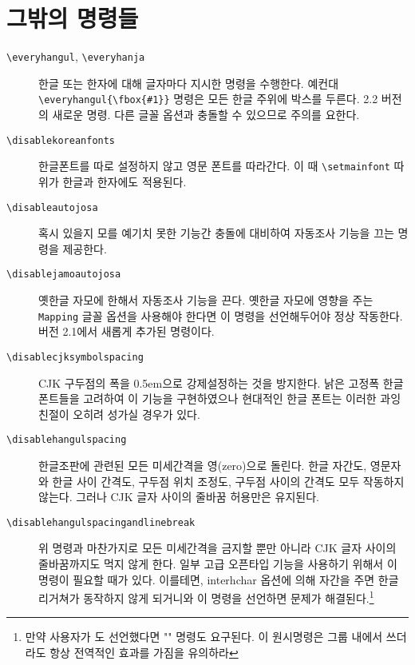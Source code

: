 \documentclass[a4paper]{article}
\def\logoko{\textsf{k}\kern-.2ex\textit{o}}
\def\XeTeX{\hologo{XeTeX}}
\def\xetexko{\XeTeX\kern-.1ex -\logoko}
\def\cs#1{\texttt{\textbackslash #1}}
\begin{document}
\section{그밖의 명령들}
\begin{description}
  \item[\cs{everyhangul}, \cs{everyhanja}]
    한글 또는 한자에 대해 글자마다 지시한 명령을 수행한다. 예컨대
    \verb|\everyhangul{\fbox{#1}}| 명령은 모든
    {\fboxsep=1pt 한글 주위에 박스}를
    두른다.  2.2 버전의 새로운 명령. 다른 글꼴 옵션과 충돌할 수 있으므로
    주의를 요한다.

  \item[\cs{disablekoreanfonts}]
한글폰트를 따로 설정하지 않고 영문 폰트를 따라간다.
이 때  \verb|\setmainfont| 따위가 한글과 한자에도 적용된다.

  \item[\cs{disableautojosa}]
혹시 있을지 모를 예기치 못한 기능간 충돌에 대비하여 자동조사 기능을
끄는 명령을 제공한다.

  \item[\cs{disablejamoautojosa}]
옛한글 자모에 한해서 자동조사 기능을 끈다.
옛한글 자모에 영향을 주는 \verb+Mapping+ 글꼴 옵션을 사용해야 한다면
이 명령을 선언해두어야 정상 작동한다.
버전 2.1에서 새롭게 추가된 명령이다.

  \item[\cs{disablecjksymbolspacing}]
CJK 구두점의 폭을 0.5em으로 강제설정하는 것을 방지한다.
 낡은 고정폭 한글 폰트들을 고려하여 이 기능을 구현하였으나
현대적인 한글 폰트는 이러한 과잉친절이 오히려 성가실 경우가 있다.

  \item[\cs{disablehangulspacing}]
한글조판에 관련된 모든 미세간격을 영(zero)으로 돌린다. 한글 자간도,
영문자와 한글 사이 간격도, 구두점 위치 조정도, 구두점 사이의 간격도
모두 작동하지 않는다. 그러나 CJK 글자 사이의 줄바꿈 허용만은 유지된다.

  \item[\cs{disablehangulspacingandlinebreak}]
위 명령과 마찬가지로 모든 미세간격을 금지할 뿐만 아니라 CJK 글자 사이의
줄바꿈까지도 먹지 않게 한다.
일부 고급 오픈타입 기능을 사용하기 위해서 이 명령이 필요할 때가 있다.
이를테면, interhchar 옵션에 의해 자간을 주면 한글 리거쳐가
동작하지 않게 되거니와 이 명령을 선언하면 문제가
해결된다.\footnote{만약 사용자가
  {\ttfamily\string\XeTeXlinebreaklocale}도 선언했다면
  {\ttfamily\string\XeTeXlinebreaklocale""} 명령도 요구된다.
  이 원시명령은 그룹 내에서 쓰더라도 항상 전역적인 효과를 가짐을 유의하라}
\end{description}
\end{document}
